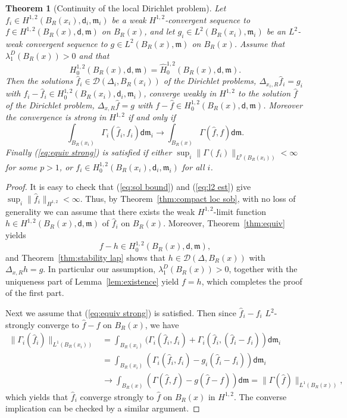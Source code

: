 \documentclass[a4paper,11pt,reqno]{article}
\numberwithin{equation}{section}
\theoremstyle{plain}
\newtheorem{theorem}{Theorem}[section]
\theoremstyle{definition}
\theoremstyle{remark}
\newcommand{\dist}{\mathsf{d}}
\newcommand{\meas}{\mathfrak{m}}
\begin{document}
{\begin{theorem}[Continuity of the local Dirichlet problem]\label{thm:conv stab}
Let $f_i \in H^{1, 2}(B_R(x_i), \dist_i, \meas_i)$ be a weak $H^{1, 2}$-convergent sequence to $f \in H^{1, 2}(B_R(x), \dist, \meas)$ on $B_R(x)$, and let $g_i \in L^2(B_R(x_i), \meas_i)$ be an $L^2$-weak convergent sequence to $g \in L^2(B_R(x), \meas)$ on $B_R(x)$.
Assume that $\lambda_1^D(B_R(x))>0$ and that 
$$
H^{1, 2}_0(B_R(x), \dist, \meas)=\hat{H}^{1, 2}_0(B_R(x), \dist, \meas).
$$
Then the solutions $\hat{f}_i \in \mathcal{D}(\Delta_i, B_R(x_i))$ of the Dirichlet problems, $\Delta_{x_i,R} \hat{f}_i=g_i$ with $f_i-\hat{f}_i \in H^{1, 2}_0(B_R(x_i), \dist_i, \meas_i)$,  converge weakly in $H^{1,2}$ to the solution $\hat{f}$ of the Dirichlet problem, $\Delta_{x,R} \hat{f}=g$ with $f-\hat{f} \in H^{1, 2}_0(B_R(x), \dist, \meas)$.
Moreover the convergence is strong in $H^{1, 2}$ if and only if 
\begin{equation}\label{eq:equiv strong}
\int_{B_R(x_i)}\Gamma_i(\hat{f}_i,f_i) \dist \meas_i \to \int_{B_R(x)}\Gamma( \hat{f}, f) \dist \meas.
\end{equation}
Finally (\ref{eq:equiv strong}) is satisfied if either $\sup_i\|\Gamma( f_i)\|_{L^p(B_R(x_i))}<\infty$ for some $p>1$, or 
$f_i \in H^{1, 2}_0(B_R(x_i), \dist_i, \meas_i)$ for all $i$.
\end{theorem}
\begin{proof}
It is easy to check that (\ref{eq:sol bound}) and (\ref{eq:l2 est}) give $\sup_i\|\hat{f}_i\|_{H^{1, 2}}<\infty$.
Thus, by Theorem~\ref{thm:compact loc sob}, with no loss of generality we can assume that there exists 
the weak $H^{1, 2}$-limit function $h \in H^{1, 2}(B_R(x), \dist, \meas)$ of $\hat{f}_i$ on $B_R(x)$.
Moreover, Theorem~\ref{thm:equiv} yields 
\begin{equation}\label{eq:compact supp}
f-h \in H^{1, 2}_0(B_R(x), \dist, \meas),
\end{equation}
and Theorem~\ref{thm:stability lap} shows that $h \in \mathcal{D}(\Delta, B_R(x))$ with $\Delta_{x,R} h=g$.
In particular our assumption, $\lambda_1^D(B_R(x))>0$, together with the uniqueness part of Lemma~\ref{lem:existence} 
yield $f=h$, which completes the proof of the first part. 

Next we assume that (\ref{eq:equiv strong}) is satisfied.
Then since $\hat{f}_i-f_i$ $L^2$-strongly converge to $\hat{f}-f$ on $B_R(x)$, we have 
\begin{align*}
\|\Gamma_i(\hat{f}_i)\|_{L^1(B_R(x_i))}&=\int_{B_R(x_i)}(\Gamma_i( \hat{f}_i, f_i)  +\Gamma_i(\hat{f}_i,  (\hat{f}_i-f_i)) \dist \meas_i \\
&=\int_{B_R(x_i)}(\Gamma_i(\hat{f}_i, f_i ) -g_i (\hat{f}_i-f_i)) \dist \meas_i \\
&\to \int_{B_R(x)}(\Gamma(\hat{f}, f) -g(\hat{f}-f)) \dist \meas =\|\Gamma(\hat{f})\|_{L^1(B_R(x))},
\end{align*}
which yields that $\hat{f}_i$ converge strongly to $\hat{f}$ on $B_R(x)$ in $H^{1, 2}$.
The converse implication can be checked by a similar argument.


\end{proof}}
\end{document}
